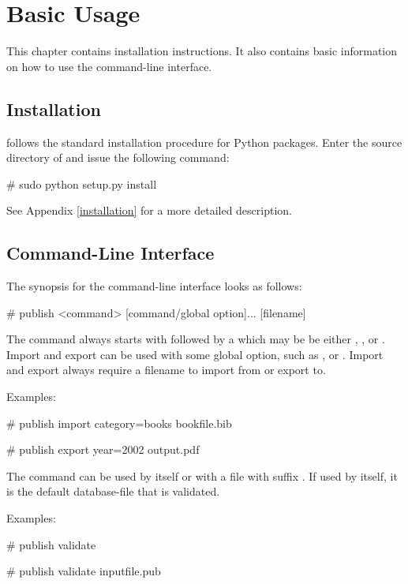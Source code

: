 \chapter{Basic Usage}

This chapter contains installation instructions. It
also contains basic information on how to use the command-line
interface.
 
\section{Installation}
\package{} follows the standard installation procedure for Python packages. 
Enter the source directory of \package{} and issue the following command:
\begin{code}
# sudo python setup.py install
\end{code}

See Appendix \ref{installation} for a more detailed description.

\section{Command-Line Interface}

The synopsis for the \package{} command-line interface looks as follows:

\begin{code}
# publish <command> [command/global option]... [filename]
\end{code}

The command always starts with  followed by a
 which may be be either , ,
or . Import and export can be used with some global
option, such as , or
. Import and export always require
a filename to import from or export to.

Examples:

\begin{code}
# publish import category=books bookfile.bib

# publish export year=2002 output.pdf
\end{code}

The command  can be used by itself or with a file with
suffix . If used by itself, it is the default database-file
 that is validated.

Examples:

\begin{code}
# publish validate

# publish validate inputfile.pub
\end{code}

